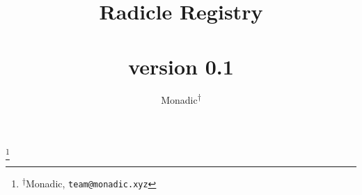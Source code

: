 \documentclass[a4paper, oneside, 10pt, final]{amsart}
\begin{document}
\title[Radicle Registry]{Radicle Registry \\ \vspace{0.5em} \\ {\tiny version 0.1}}
\author{\Small Monadic\textsuperscript{$\dagger$}}

\thanks{\textsuperscript{$\dagger$}Monadic, \texttt{team@monadic.xyz}}

\maketitle

\setlength{\columnsep}{1cm}
\begin{multicols}{2}



\end{multicols}
\end{document}
